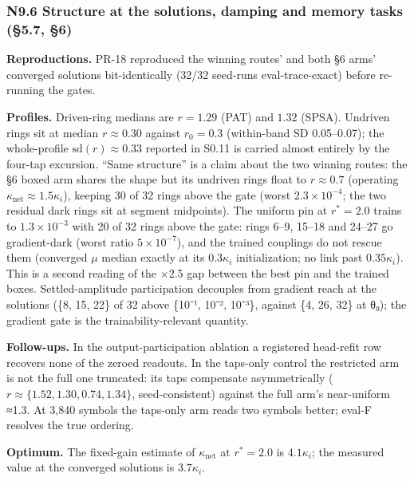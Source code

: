 \documentclass[
  10pt,
]{article}
\newcounter{none} %
\begin{document}
\subsubsection{N9.6 Structure at the solutions, damping and memory tasks
(§5.7,
§6)}\label{n9.6-structure-at-the-solutions-damping-and-memory-tasks-5.7-6}

\textbf{Reproductions.} PR-18 reproduced the winning routes' and both §6
arms' converged solutions bit-identically (32/32 seed-runs
eval-trace-exact) before re-running the gates.

\textbf{Profiles.} Driven-ring medians are \(r = 1.29\) (PAT) and
\(1.32\) (SPSA). Undriven rings sit at median \(r \approx 0.30\) against
\(r_0 = 0.3\) (within-band SD 0.05--0.07); the whole-profile
\(\mathrm{sd}(r) \approx 0.33\) reported in S0.11 is carried almost
entirely by the four-tap excursion. ``Same structure'' is a claim about
the two winning routes: the §6 boxed arm shares the shape but its
undriven rings float to \(r \approx 0.7\) (operating
\(\kappa_\text{net} \approx
1.5\kappa_i\)), keeping 30 of 32 rings above the gate (worst
\(2.3\times10^{-4}\); the two residual dark rings sit at segment
midpoints). The uniform pin at \(r^* = 2.0\) trains to
\(1.3\times10^{-3}\) with 20 of 32 rings above the gate: rings 6--9,
15--18 and 24--27 go gradient-dark (worst ratio \(5\times10^{-7}\)), and
the trained couplings do not rescue them (converged \(\mu\) median
exactly at its \(0.3\kappa_i\) initialization; no link past
\(0.35\kappa_i\)). This is a second reading of the ×2.5 gap between the
best pin and the trained boxes. Settled-amplitude participation
decouples from gradient reach at the solutions (\{8, 15, 22\} of 32
above \{10⁻¹, 10⁻², 10⁻³\}, against \{4, 26, 32\} at θ₀); the gradient
gate is the trainability-relevant quantity.

\textbf{Follow-ups.} In the output-participation ablation a registered
head-refit row recovers none of the zeroed readouts. In the taps-only
control the restricted arm is not the full one truncated: its taps
compensate asymmetrically (\(r \approx \{1.52, 1.30, 0.74, 1.34\}\),
seed-consistent) against the full arm's near-uniform ≈1.3. At 3,840
symbols the taps-only arm reads two symbols better; eval-F resolves the
true ordering.

\textbf{Optimum.} The fixed-gain estimate of \(\kappa_\text{net}\) at
\(r^* = 2.0\) is \(4.1\kappa_i\); the measured value at the converged
solutions is \(3.7\kappa_i\).
\end{document}
